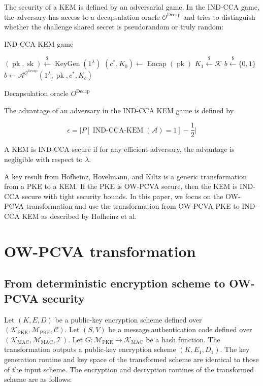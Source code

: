 \documentclass{article}
\newcommand{\norm}[1]{\vert {#1} \vert}
\newcommand{\leftsample}{\overset{{\scriptscriptstyle\$}}{\leftarrow}}
\newcommand{\keygen}{\operatorname{KeyGen}}
\newcommand{\pk}{\operatorname{pk}}
\newcommand{\sk}{\operatorname{sk}}
\newcommand{\encap}{\operatorname{Encap}}
\newcommand{\decap}{\operatorname{Decap}}
\newcommand{\llbrack}{[\![}
\newcommand{\rrbrack}{]\!]}
\begin{document}
The security of a KEM is defined by an adversarial game. In the IND-CCA game, the adversary has access to a decapsulation oracle $\mathcal{O}^{\decap}$ and tries to distinguish whether the challenge shared secret is pseudorandom or truly random:

\begin{multicols}{2}
    \begin{algorithm}[H]
        \caption{IND-CCA KEM game}
        $(\pk, \sk) \leftsample \keygen(1^\lambda)$\;
        $(c^\ast, K_0) \leftarrow \encap(\pk)$\;
        $K_1 \leftsample \mathcal{K}$\;
        $b \leftsample \{0, 1\}$\;
        $\hat{b} \leftarrow \mathcal{A}^{\mathcal{O}^{\decap}}(1^\lambda, \pk, c^\ast, K_b)$\;
        \Return{
            $\llbrack \hat{b} = b \rrbrack$
        }
    \end{algorithm}

    \begin{algorithm}[H]
        \caption{Decapsulation oracle $O^{\decap}$}
        \Return{
            $\decap(\sk, c)$
        }
    \end{algorithm}
\end{multicols}

The advantage of an adversary in the IND-CCA KEM game is defined by 

$$\epsilon = \norm{P[\operatorname{IND-CCA-KEM}(\mathcal{A}) = 1] - \frac{1}{2}}$$

A KEM is IND-CCA secure if for any efficient adversary, the advantage is negligible with respect to $\lambda$.

A key result from Hofheinz, Hovelmann, and Kiltz\cite{hofheinz2017modular} is a generic transformation from a PKE to a KEM. If the PKE is OW-PCVA secure, then the KEM is IND-CCA secure with tight security bounds. In this paper, we focus on the OW-PCVA transformation and use the transformation from OW-PCVA PKE to IND-CCA KEM as described by Hofheinz et al.

\section{OW-PCVA transformation}\label{sec:ow-pcva-transformation}

\subsection{From deterministic encryption scheme to OW-PCVA security}
Let $(K, E, D)$ be a public-key encryption scheme defined over $(\mathcal{K}_\text{PKE}, \mathcal{M}_\text{PKE}, \mathcal{C})$. Let $(S, V)$ be a message authentication code defined over $(\mathcal{K}_\text{MAC}, \mathcal{M}_\text{MAC}, \mathcal{T})$. Let $G: \mathcal{M}_\text{PKE} \rightarrow \mathcal{K}_\text{MAC}$ be a hash function. The transformation outputs a public-key encryption scheme $(K, E_1, D_1)$. The key generation routine and key space of the transformed scheme are identical to those of the input scheme. The encryption and decryption routines of the transformed scheme are as follows:
\end{document}
